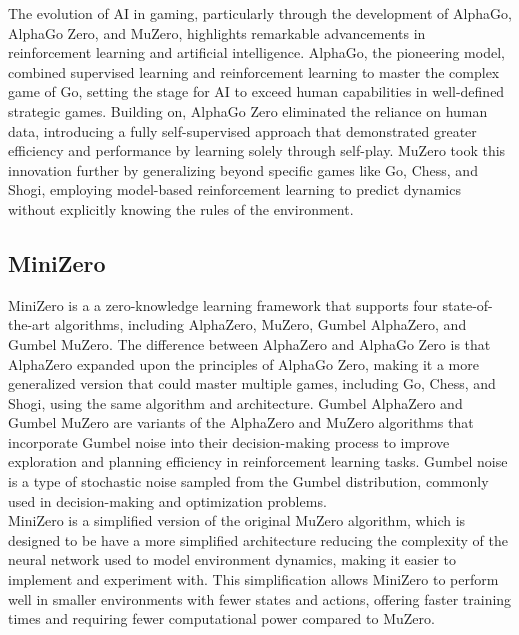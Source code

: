 The evolution of AI in gaming, particularly through the development 
of AlphaGo, AlphaGo Zero, and MuZero, highlights remarkable advancements
in reinforcement learning and artificial intelligence. AlphaGo, the pioneering model, 
combined supervised learning and reinforcement learning to master the 
complex game of Go, setting the stage for AI to exceed human capabilities 
in well-defined strategic games. Building on, AlphaGo 
Zero eliminated the reliance on human data, introducing a fully 
self-supervised approach that demonstrated greater efficiency and 
performance by learning solely through self-play. MuZero took this 
innovation further by generalizing beyond specific games like Go, 
Chess, and Shogi, employing model-based reinforcement learning to 
predict dynamics without explicitly knowing the rules of the environment.
\subsection{MiniZero}
MiniZero is a a zero-knowledge learning framework that supports four 
state-of-the-art algorithms, including AlphaZero, MuZero, Gumbel 
AlphaZero, and Gumbel MuZero\cite{AD1}. The difference between 
AlphaZero and AlphaGo Zero is that AlphaZero expanded upon the 
principles of AlphaGo Zero, making it a more generalized version 
that could master multiple games, including Go, Chess, and Shogi, 
using the same algorithm and architecture. Gumbel AlphaZero and Gumbel 
MuZero are variants of the AlphaZero and MuZero algorithms that 
incorporate Gumbel noise into their decision-making process to improve 
exploration and planning efficiency in reinforcement learning tasks.
Gumbel noise is a type of stochastic noise sampled from the Gumbel distribution, 
commonly used in decision-making and optimization problems.\\
MiniZero is a simplified version of the original MuZero algorithm,
which is designed to be have a more simplified architecture reducing 
the complexity of the neural network used to model environment dynamics, 
making it easier to implement and experiment with. This simplification 
allows MiniZero to perform well in smaller environments with fewer states 
and actions, offering faster training times and requiring fewer computational 
power compared to MuZero. 
